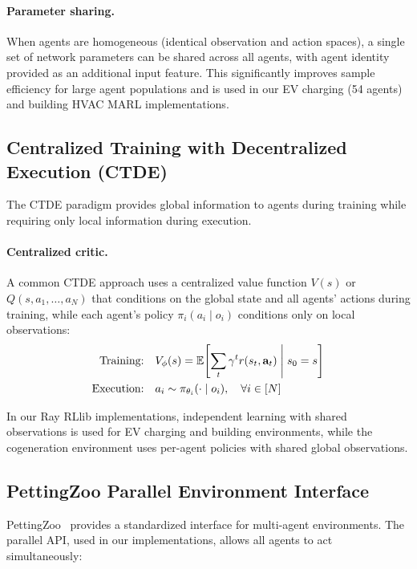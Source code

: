 \paragraph{Parameter sharing.} When agents are homogeneous (identical observation and action spaces), a single set of network parameters can be shared across all agents, with agent identity provided as an additional input feature. This significantly improves sample efficiency for large agent populations and is used in our EV charging (54 agents) and building HVAC MARL implementations.

\subsection{Centralized Training with Decentralized Execution (CTDE)}

The CTDE paradigm provides global information to agents during training while requiring only local information during execution.

\paragraph{Centralized critic.} A common CTDE approach uses a centralized value function $V(s)$ or $Q(s, a_1, \ldots, a_N)$ that conditions on the global state and all agents' actions during training, while each agent's policy $\pi_i(a_i \mid o_i)$ conditions only on local observations:
\begin{align}
    \text{Training:} \quad & V_\phi(s) = \mathbb{E}\!\left[\sum_t \gamma^t r(s_t, \mathbf{a}_t) \;\middle|\; s_0 = s\right] \\
    \text{Execution:} \quad & a_i \sim \pi_{\theta_i}(\cdot \mid o_i), \quad \forall i \in [N]
\end{align}

In our Ray RLlib implementations, independent learning with shared observations is used for EV charging and building environments, while the cogeneration environment uses per-agent policies with shared global observations.

\subsection{PettingZoo Parallel Environment Interface}

PettingZoo~\citep{terry2021pettingzoo} provides a standardized interface for multi-agent environments. The parallel API, used in our implementations, allows all agents to act simultaneously:

